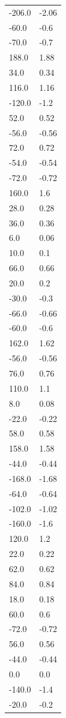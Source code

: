\begin{longtable}{ll}
-206.0 & -2.06 \\
-60.0 & -0.6 \\
-70.0 & -0.7 \\
188.0 & 1.88 \\
34.0 & 0.34 \\
116.0 & 1.16 \\
-120.0 & -1.2 \\
52.0 & 0.52 \\
-56.0 & -0.56 \\
72.0 & 0.72 \\
-54.0 & -0.54 \\
-72.0 & -0.72 \\
160.0 & 1.6 \\
28.0 & 0.28 \\
36.0 & 0.36 \\
6.0 & 0.06 \\
10.0 & 0.1 \\
66.0 & 0.66 \\
20.0 & 0.2 \\
-30.0 & -0.3 \\
-66.0 & -0.66 \\
-60.0 & -0.6 \\
162.0 & 1.62 \\
-56.0 & -0.56 \\
76.0 & 0.76 \\
110.0 & 1.1 \\
8.0 & 0.08 \\
-22.0 & -0.22 \\
58.0 & 0.58 \\
158.0 & 1.58 \\
-44.0 & -0.44 \\
-168.0 & -1.68 \\
-64.0 & -0.64 \\
-102.0 & -1.02 \\
-160.0 & -1.6 \\
120.0 & 1.2 \\
22.0 & 0.22 \\
62.0 & 0.62 \\
84.0 & 0.84 \\
18.0 & 0.18 \\
60.0 & 0.6 \\
-72.0 & -0.72 \\
56.0 & 0.56 \\
-44.0 & -0.44 \\
0.0 & 0.0 \\
-140.0 & -1.4 \\
-20.0 & -0.2 \\

\end{longtable}
